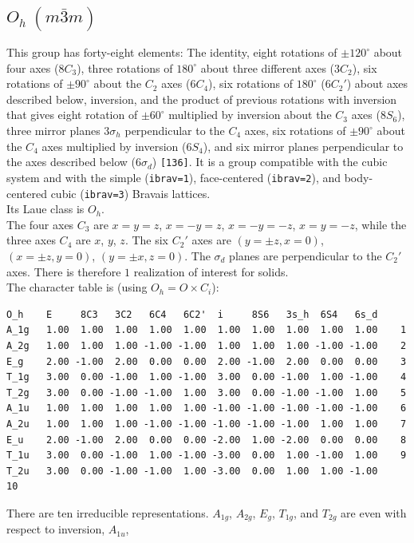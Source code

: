 \documentclass[12pt,a4paper]{article}
\begin{document}
\newpage
\subsection{\color{web-blue}$O_h\ (m\bar3m)$}   
This group has forty-eight elements: 
The identity, eight rotations of $\pm120^\circ$ about four axes ($8C_3$), 
three rotations of $180^\circ$ about three different axes ($3C_2$), six
rotations of $\pm90^\circ$ about the $C_2$ axes ($6C_4$), 
six rotations of $180^\circ$ ($6C_2'$) about axes described below, 
inversion, and the product of previous rotations with inversion that gives
eight rotation of $\pm60^\circ$ multiplied by inversion about the $C_3$ axes 
($8S_6$), three mirror planes $3\sigma_h$ perpendicular to the $C_4$ axes,
six rotations of $\pm90^\circ$ about the $C_4$ axes multiplied by inversion
($6S_4$), and six mirror planes perpendicular to the axes described
below ($6\sigma_d$) \texttt{[136]}. It is a group compatible with the 
cubic system and with the  
simple (\texttt{ibrav=1}), face-centered (\texttt{ibrav=2}), 
and body-centered cubic (\texttt{ibrav=3}) Bravais lattices. \\
Its Laue class is $O_{h}$. \\
The four axes $C_3$ are $x=y=z$, $x=-y=z$, $x=-y=-z$, $x=y=-z$, while
the three axes $C_4$ are $x$, $y$, $z$. 
The six $C_2'$ axes are $(y=\pm z, x=0)$, $(x=\pm z, y=0)$, $(y=\pm x, z=0)$.
The $\sigma_d$ planes are perpendicular to the $C_2'$ axes.
There is therefore $1$ realization of interest for solids. \\
The character table is (using $O_h=O \times C_i$):
\begin{verbatim}
O_h    E     8C3   3C2   6C4   6C2'  i     8S6   3s_h  6S4   6s_d 
A_1g   1.00  1.00  1.00  1.00  1.00  1.00  1.00  1.00  1.00  1.00    1
A_2g   1.00  1.00  1.00 -1.00 -1.00  1.00  1.00  1.00 -1.00 -1.00    2
E_g    2.00 -1.00  2.00  0.00  0.00  2.00 -1.00  2.00  0.00  0.00    3
T_1g   3.00  0.00 -1.00  1.00 -1.00  3.00  0.00 -1.00  1.00 -1.00    4
T_2g   3.00  0.00 -1.00 -1.00  1.00  3.00  0.00 -1.00 -1.00  1.00    5
A_1u   1.00  1.00  1.00  1.00  1.00 -1.00 -1.00 -1.00 -1.00 -1.00    6
A_2u   1.00  1.00  1.00 -1.00 -1.00 -1.00 -1.00 -1.00  1.00  1.00    7
E_u    2.00 -1.00  2.00  0.00  0.00 -2.00  1.00 -2.00  0.00  0.00    8
T_1u   3.00  0.00 -1.00  1.00 -1.00 -3.00  0.00  1.00 -1.00  1.00    9
T_2u   3.00  0.00 -1.00 -1.00  1.00 -3.00  0.00  1.00  1.00 -1.00    10
\end{verbatim}
There are ten irreducible representations. $A_{1g}$, $A_{2g}$, $E_g$,
$T_{1g}$, and $T_{2g}$ are even with respect to inversion, $A_{1u}$, 
\end{document}
